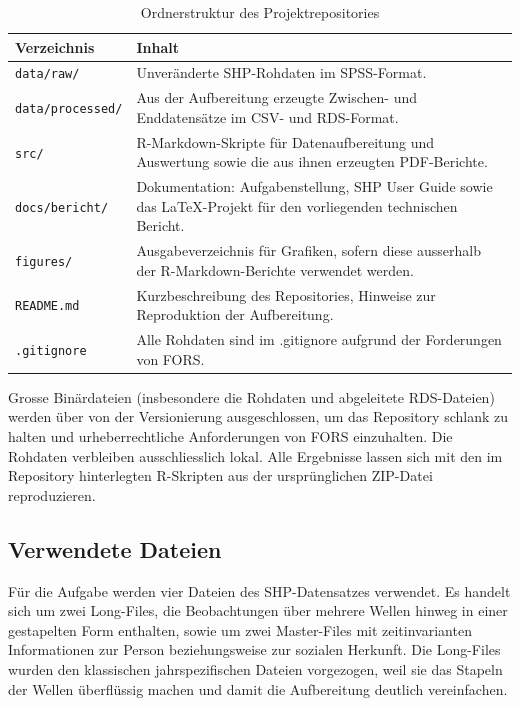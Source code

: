 \begin{table}[h]
\centering
\caption{Ordnerstruktur des Projektrepositories}
\label{tab:ordnerstruktur}
\begin{tabularx}{\textwidth}{lX}
\toprule
Verzeichnis & Inhalt \\
\midrule
\texttt{data/raw/}           & Unveränderte SHP-Rohdaten im SPSS-Format. \\

\texttt{data/processed/}     & Aus der Aufbereitung erzeugte Zwischen- und Enddatensätze im CSV- und RDS-Format. \\

\texttt{src/}                & R-Markdown-Skripte für Datenaufbereitung und Auswertung sowie die aus ihnen erzeugten PDF-Berichte. \\

\texttt{docs/bericht/}       & Dokumentation: Aufgabenstellung, SHP User Guide sowie das \LaTeX-Projekt für den vorliegenden technischen Bericht. \\

\texttt{figures/}            & Ausgabeverzeichnis für Grafiken, sofern diese ausserhalb der R-Markdown-Berichte verwendet werden. \\

\texttt{README.md}           & Kurzbeschreibung des Repositories, Hinweise zur Reproduktion der Aufbereitung. \\

\texttt{.gitignore}          & Alle Rohdaten sind im .gitignore aufgrund der Forderungen von FORS. \\
\bottomrule
\end{tabularx}
\end{table}

Grosse Binärdateien (insbesondere die Rohdaten und abgeleitete RDS-Dateien) werden über 
von der Versionierung ausgeschlossen, um das Repository schlank zu halten und
urheberrechtliche Anforderungen von FORS einzuhalten. Die Rohdaten verbleiben
ausschliesslich lokal. Alle Ergebnisse lassen sich mit den im Repository hinterlegten
R-Skripten aus der ursprünglichen ZIP-Datei reproduzieren.

\subsection{Verwendete Dateien}
\label{subsec:dateien}

Für die Aufgabe werden vier Dateien des SHP-Datensatzes verwendet. Es handelt sich um
zwei Long-Files, die Beobachtungen über mehrere Wellen hinweg in einer gestapelten
Form enthalten, sowie um zwei Master-Files mit zeitinvarianten Informationen zur Person
beziehungsweise zur sozialen Herkunft. Die Long-Files wurden den klassischen
jahrspezifischen Dateien vorgezogen, weil sie das Stapeln der Wellen überflüssig machen
und damit die Aufbereitung deutlich vereinfachen.

